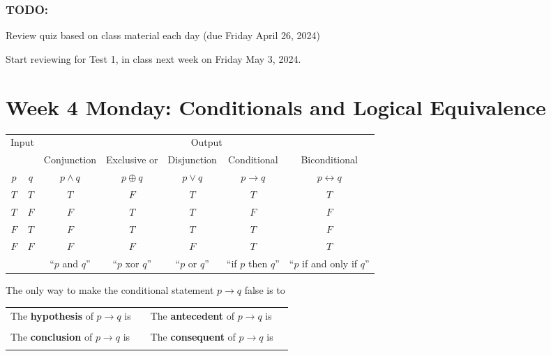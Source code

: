 \documentclass[12pt, oneside]{article}
\begin{document}
\subsubsection*{TODO:}
\begin{list}
   {\itemsep2pt}
   \item Review quiz based on class material each day (due Friday April 26, 2024)
   \item Start reviewing for Test 1, in class next week on Friday May 3, 2024.
\end{list}

\newpage

\section*{Week 4 Monday: Conditionals and Logical Equivalence}


\begin{center}
    \begin{tabular}{cc||c|c|c|c|c}
    \multicolumn{2}{c||}{Input}  & \multicolumn{5}{c}{Output} \\
     & & Conjunction &  Exclusive or & Disjunction  &  Conditional & Biconditional  \\
    $p$ & $q$ & $p \wedge q$ &  $p  \oplus  q$ & $p \vee  q$ & $p \to q$ & $p \leftrightarrow q$\\
    \hline
    $T$ & $T$ & $T$ & $F$ & $T$ & $T$& $T$\\
    $T$ & $F$ & $F$ & $T$ & $T$ & $F$& $F$\\
    $F$ & $T$ & $F$ & $T$ & $T$ & $T$& $F$\\
    $F$ & $F$ & $F$ & $F$ & $F$ & $T$& $T$\\
    \hline
    && ``$p$ and $q$'' & ``$p$ xor $q$'' & ``$p$ or $q$'' & ``if $p$ then $q$'' & ``$p$ if and only if $q$''
    \end{tabular}
\end{center}
     

The only way to make  the conditional statement $p \to q$ false is to \underline{\phantom{\hspace{3in}}}\\

\begin{tabular}{llll}
The {\bf  hypothesis}  of $p \to q$ is  &\underline{\phantom{\hspace{1in}}} &
The {\bf  antecedent}  of $p \to q$ is  &\underline{\phantom{\hspace{1in}}} \\
&&&  \\
The {\bf  conclusion}  of $p \to q$ is & \underline{\phantom{\hspace{1in}}}&
The {\bf  consequent}  of $p \to q$ is & \underline{\phantom{\hspace{1in}}}\\
&&&  \\
\end{tabular}
 
\end{document}
